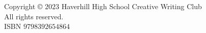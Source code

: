 \vspace*{\fill}
\begin{center}
    Copyright \copyright{} $2023$ Haverhill High School Creative Writing Club\\
    All rights reserved.\\
    ISBN $9798392654864$
\end{center}

